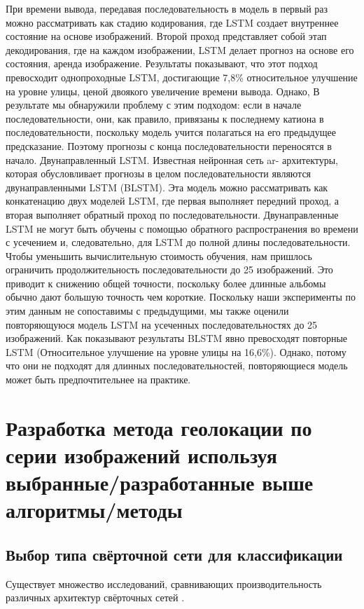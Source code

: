 При времени вывода, передавая последовательность в модель
в первый раз можно рассматривать как стадию кодирования, где
LSTM создает внутреннее состояние на основе изображений.
Второй проход представляет собой этап декодирования, где на каждом изображении,
LSTM делает прогноз на основе его состояния,
аренда изображение. Результаты показывают, что этот подход превосходит
однопроходные LSTM, достигающие 7,8\%
относительное улучшение на уровне улицы, ценой двоякого
увеличение времени вывода. Однако,
В результате мы обнаружили проблему с этим подходом:
если в начале
последовательности, они, как правило, привязаны к последнему
катиона в последовательности, поскольку модель учится полагаться на
его предыдущее предсказание. Поэтому прогнозы с конца
последовательности переносятся в начало.
Двунаправленный LSTM. Известная нейронная сеть ar-
архитектуры, которая обусловливает прогнозы в целом
последовательности являются двунаправленными LSTM (BLSTM). Эта модель можно рассматривать как конкатенацию двух моделей LSTM, где первая выполняет передний проход, а вторая выполняет обратный проход по последовательности. Двунаправленные LSTM не могут быть обучены с помощью обратного распространения во времени с усечением и, следовательно, для LSTM до полной длины последовательности. Чтобы уменьшить
вычислительную стоимость обучения, нам пришлось ограничить продолжительность
последовательности до 25 изображений. Это приводит к снижению общей
точности, поскольку более длинные альбомы обычно дают
большую точность чем короткие. Поскольку наши эксперименты по этим данным
не сопоставимы с предыдущими, мы также
оценили повторяющуюся модель LSTM на усеченных последовательностях
до 25 изображений. Как показывают результаты BLSTM явно превосходят повторные LSTM
(Относительное улучшение на уровне улицы на 16,6\%). Однако,
потому что они не подходят для длинных последовательностей, повторяющиеся модель может быть предпочтительнее на практике.


\section{Разработка метода геолокации по серии изображений используя выбранные/разработанные выше алгоритмы/методы}

\subsection{Выбор типа свёрточной сети для классификации}

Существует множество исследований, сравнивающих производительность различных архитектур свёрточных сетей \cite{сикорский2017обзор}.

